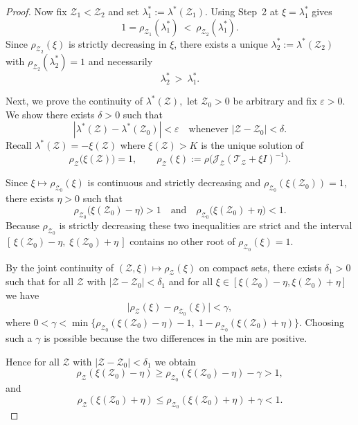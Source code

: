 \documentclass[10pt,a4paper]{amsart}
\begin{document}
\begin{proof}
Now fix $\mathcal Z_1<\mathcal Z_2$ and set $\lambda_1^\ast:=\lambda^\ast(\mathcal Z_1)$.
Using Step~2 at $\xi=\lambda_1^\ast$ gives
\[
1=\rho_{\mathcal Z_1}(\lambda_1^\ast)\ <\ \rho_{\mathcal Z_2}(\lambda_1^\ast).
\]
Since $\rho_{\mathcal Z_2}(\xi)$ is strictly decreasing in $\xi$, there exists a unique
$\lambda_2^\ast:=\lambda^\ast(\mathcal Z_2)$ with
$\rho_{\mathcal Z_2}(\lambda_2^\ast)=1$ and necessarily
\[
\lambda_2^\ast\ >\ \lambda_1^\ast.
\]

\medskip

Next, we prove the continuity of $\lambda^\ast(\mathcal{Z}),$
let $\mathcal Z_0>0$ be arbitrary and fix $\varepsilon>0$. We show there exists $\delta>0$ such that
\[
|\lambda^\ast(\mathcal Z)-\lambda^\ast(\mathcal Z_0)|<\varepsilon
\quad\text{whenever } |\mathcal Z-\mathcal Z_0|<\delta.
\]
Recall $\lambda^\ast(\mathcal Z)=-\xi(\mathcal Z)$ where $\xi(\mathcal Z)>K$ is the unique solution of
\[
\rho_{\mathcal Z}\big(\xi(\mathcal Z)\big)=1,\qquad
\rho_{\mathcal Z}(\xi):=\rho\!\big(\mathscr J_{\mathcal Z}(\mathscr T_{\mathcal Z}+\xi I)^{-1}\big).
\]


Since \(\xi\mapsto\rho_{\mathcal Z_0}(\xi)\) is continuous and strictly decreasing and
\(\rho_{\mathcal Z_0}(\xi(\mathcal Z_0))=1\), there exists \(\eta>0\) such that
\[
\rho_{\mathcal Z_0}\big(\xi(\mathcal Z_0)-\eta\big) > 1 \quad\text{and}\quad
\rho_{\mathcal Z_0}\big(\xi(\mathcal Z_0)+\eta\big) < 1.
\]
Because \(\rho_{\mathcal Z_0}\) is strictly decreasing these two inequalities are strict and the interval
\([\,\xi(\mathcal Z_0)-\eta,\; \xi(\mathcal Z_0)+\eta\,]\) contains no other root of \(\rho_{\mathcal Z_0}(\xi)=1\).


By the joint continuity of \((\mathcal Z,\xi)\mapsto\rho_{\mathcal Z}(\xi)\) on compact sets, there exists
\(\delta_1>0\) such that for all \(\mathcal Z\) with \(|\mathcal Z-\mathcal Z_0|<\delta_1\) and for all
\(\xi\in[\xi(\mathcal Z_0)-\eta,\xi(\mathcal Z_0)+\eta]\) we have
\[
\big|\rho_{\mathcal Z}(\xi)-\rho_{\mathcal Z_0}(\xi)\big| < \gamma,
\]
where \(0<\gamma<\min\{\rho_{\mathcal Z_0}(\xi(\mathcal Z_0)-\eta)-1,\;1-\rho_{\mathcal Z_0}(\xi(\mathcal Z_0)+\eta)\}\).
Choosing such a \(\gamma\) is possible because the two differences in the min are positive.

Hence for all \(\mathcal Z\) with \(|\mathcal Z-\mathcal Z_0|<\delta_1\) we obtain
\[
\rho_{\mathcal Z}(\xi(\mathcal Z_0)-\eta) \ge \rho_{\mathcal Z_0}(\xi(\mathcal Z_0)-\eta)-\gamma > 1,
\]
and
\[
\rho_{\mathcal Z}(\xi(\mathcal Z_0)+\eta) \le \rho_{\mathcal Z_0}(\xi(\mathcal Z_0)+\eta)+\gamma < 1.
\]


\end{proof}
\end{document}
